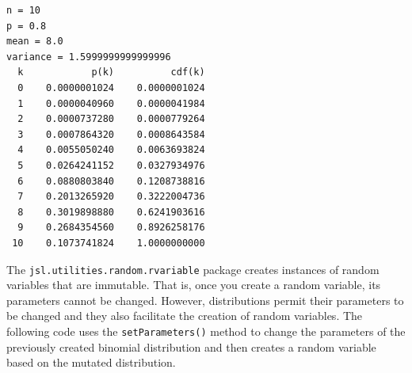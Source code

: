 \documentclass[
]{book}
\theoremstyle{definition}
\theoremstyle{definition}
\theoremstyle{definition}
\theoremstyle{definition}
\theoremstyle{remark}
\begin{document}
\begin{verbatim}
n = 10
p = 0.8
mean = 8.0
variance = 1.5999999999999996
  k            p(k)          cdf(k) 
  0    0.0000001024    0.0000001024 
  1    0.0000040960    0.0000041984 
  2    0.0000737280    0.0000779264 
  3    0.0007864320    0.0008643584 
  4    0.0055050240    0.0063693824 
  5    0.0264241152    0.0327934976 
  6    0.0880803840    0.1208738816 
  7    0.2013265920    0.3222004736 
  8    0.3019898880    0.6241903616 
  9    0.2684354560    0.8926258176 
 10    0.1073741824    1.0000000000 
\end{verbatim}

The \texttt{jsl.utilities.random.rvariable} package creates instances of random variables that are immutable. That is, once you create a random variable, its parameters cannot be changed. However, distributions permit their parameters to be changed and they also facilitate the creation of random variables. The following code uses the \texttt{setParameters()} method to change the parameters of the previously created binomial distribution and then creates a random variable based on the mutated distribution.
\end{document}
